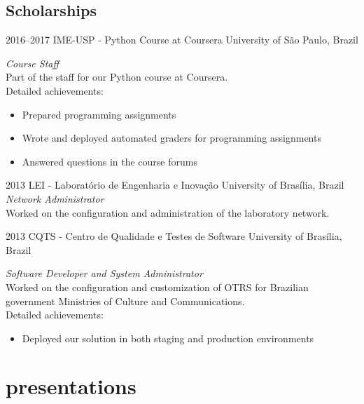 \documentclass[print]{friggeri-cv}
\begin{document}
\subsection{Scholarships}

\begin{entrylist}

\entry
{2016--2017}
{IME-USP - Python Course at Coursera}
{University of São Paulo, Brazil}
{\emph{Course Staff} \\
Part of the staff for our Python course at Coursera. \\
Detailed achievements:
\begin{itemize}
  \item Prepared programming assignments
  \item Wrote and deployed automated graders for programming assignments
  \item Answered questions in the course forums
\end{itemize}}

\entry
{2013}
{LEI - Laboratório de Engenharia e Inovação}
{University of Brasília, Brazil}
{\emph{Network Administrator} \\
  Worked on the configuration and administration of the laboratory network. \\
}


\entry
{2013}
{CQTS - Centro de Qualidade e Testes de Software}
{University of Brasília, Brazil}
{\emph{Software Developer and System Administrator} \\
  Worked on the configuration and customization of OTRS for Brazilian
  government Ministries of Culture and Communications. \\
Detailed achievements:
\begin{itemize}
  \item Deployed our solution in both staging and production environments
\end{itemize}}

\end{entrylist}

\section{presentations}
\end{document}
